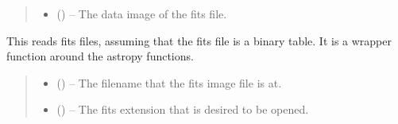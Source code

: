 \documentclass[letterpaper,11pt,english]{sphinxmanual}
\begin{document}
\begin{savenotes}
\begin{fulllineitems}
\begin{quote}
\begin{description}
\begin{itemize}
\item {} 
\sphinxAtStartPar
{} () – The data image of the fits file.

\end{itemize}


\end{description}\end{quote}

\end{fulllineitems}\end{savenotes}


\begin{savenotes}\begin{fulllineitems}
\label{\detokenize{code/opihiexarata.library.fits:opihiexarata.library.fits.read_fits_table_file}}
\pysigstartsignatures
{}
\pysigstopsignatures
\sphinxAtStartPar
This reads fits files, assuming that the fits file is a binary table.
It is a wrapper function around the astropy functions.
\begin{quote}\begin{description}
\begin{itemize}
\item {} 
\sphinxAtStartPar
{} () – The filename that the fits image file is at.

\item {} 
\sphinxAtStartPar
{} (\sphinxstyleliteralemphasis{\sphinxupquote{, }}) – The fits extension that is desired to be opened.


\end{itemize}
\end{description}
\end{quote}
\end{fulllineitems}
\end{savenotes}
\end{document}
